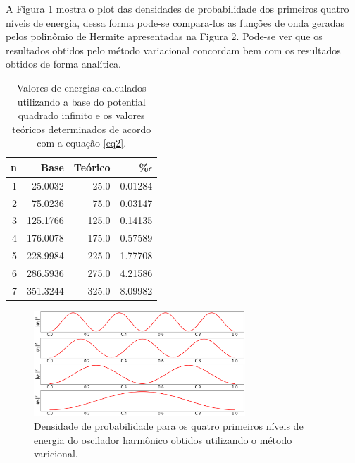 \documentclass[11pt]{article}
\begin{document}
A Figura 1 mostra o plot das densidades de probabilidade dos primeiros quatro níveis de energia, dessa forma pode-se compara-los as funções de onda geradas pelos polinômio de Hermite apresentadas na Figura 2. Pode-se ver que os resultados obtidos pelo método variacional concordam bem com os resultados obtidos de forma analítica.

\begin{table}[htbp]
\caption{Valores de energias calculados utilizando a base do potential quadrado infinito e os valores teóricos determinados de acordo com a equação \ref{eq2}.}
\centering
\begin{tabular}{rrrr}
\hline
n & Base & Teórico & \%\(\epsilon\)\\
\hline
1 & 25.0032 & 25.0 & 0.01284\\
2 & 75.0236 & 75.0 & 0.03147\\
3 & 125.1766 & 125.0 & 0.14135\\
4 & 176.0078 & 175.0 & 0.57589\\
5 & 228.9984 & 225.0 & 1.77708\\
6 & 286.5936 & 275.0 & 4.21586\\
7 & 351.3244 & 325.0 & 8.09982\\
\hline
\end{tabular}
\end{table}


\begin{figure}[htbp]
\centering
\includegraphics[width=300]{./wavefunction.png}
\caption{Densidade de probabilidade para os quatro primeiros níveis de energia do oscilador harmônico obtidos utilizando o método varicional.}
\end{figure}
\end{document}
